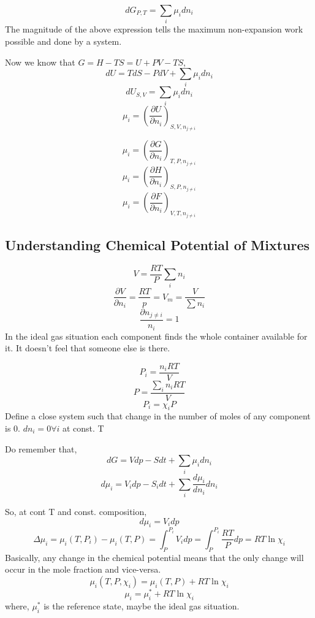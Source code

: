 \documentclass{article}
\theoremstyle{definition}
\begin{document}
\[
\boxed{dG_{P,T}} = \sum_i \mu_i dn_i 
\]
The magnitude of the above expression tells the maximum non-expansion work possible and done by a system.

Now we know that $G = H-TS = U+ PV -TS$, 
\[
dU = TdS -PdV +\sum_i\mu_i dn_i
\]
\[
dU_{S,V} = \sum_i \mu_idn_i
\]
\[
\boxed{\mu_i=\left ( \frac{\partial U}{\partial n_i} \right)_{S,V, n_{j\neq i}}} 
\]

\[
\boxed{\mu_i=\left ( \frac{\partial G}{\partial n_i} \right)_{T,P, n_{j\neq i}}} 
\]
\[
\boxed{\mu_i=\left ( \frac{\partial H}{\partial n_i} \right)_{S,P, n_{j\neq i}}} 
\]
\[
\boxed{\mu_i=\left ( \frac{\partial F}{\partial n_i} \right)_{V,T, n_{j\neq i}}} 
\]

\subsection{Understanding Chemical Potential of Mixtures}
\[
V = \frac{RT}{P} \sum_i n_i 
\]
\[
\frac{\partial V}{\partial n_i } = \frac{RT}{p}= V_m = \frac{V}{\sum n_i}

\]
\[
\frac{\partial n_{j \neq i}}{n_i}= 1
\]
In the ideal gas situation each component finds the whole container available for it. It doesn't feel that someone else is there. 

\[
P_i = \frac{n_i RT}{V}
\]
\[
P = \frac{\sum_i n_i RT}{V}
\]
\[
P_i = \chi_i P
\]
Define a close system such that change in the number of moles of any component is 0. $dn_i = 0 \forall i$ at const. T

Do remember that, 
\[
dG = Vdp -Sdt + \sum_i \mu_idn_i
\]
\[
d\mu_i = V_idp -S_idt + \sum_i \frac{d\mu_i}{dn_i}dn_i
\]
\begin{center}
    

\end{center}
So, at cont T and const. composition,
\[
d\mu_i = V_i dp
\]
\[
\Delta \mu_i = \mu_i (T, P_i) - \mu_i(T,P) = \int_P^{P_i} V_idp = \int_P^{P_i} \frac{RT}{P} dp = RT \ln{\chi_i}
\]
Basically, any change in the chemical potential means that the only change will occur in the mole fraction and vice-versa.
\[
\mu_i (T,P, \chi_i) = \mu_i(T,P) + RT\ln{\chi_i}
\]
\[
\mu_i = \mu_i^* + RT\ln{\chi_i}
\]
where, $\mu_i^*$ is the reference state, maybe the ideal gas situation. 
\end{document}

